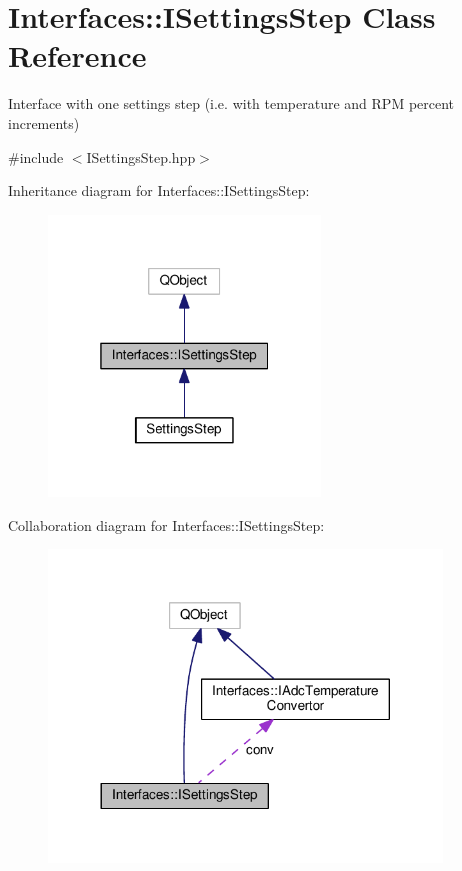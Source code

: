 \hypertarget{class_interfaces_1_1_i_settings_step}{}\section{Interfaces\+:\+:I\+Settings\+Step Class Reference}
\label{class_interfaces_1_1_i_settings_step}


Interface with one settings step (i.\+e. with temperature and R\+PM percent increments)  




{\ttfamily \#include $<$I\+Settings\+Step.\+hpp$>$}



Inheritance diagram for Interfaces\+:\+:I\+Settings\+Step\+:\nopagebreak
\begin{figure}[H]
\begin{center}
\leavevmode
\includegraphics[width=205pt]{class_interfaces_1_1_i_settings_step__inherit__graph}
\end{center}
\end{figure}


Collaboration diagram for Interfaces\+:\+:I\+Settings\+Step\+:
\nopagebreak
\begin{figure}[H]
\begin{center}
\leavevmode
\includegraphics[width=296pt]{class_interfaces_1_1_i_settings_step__coll__graph}
\end{center}
\end{figure}
